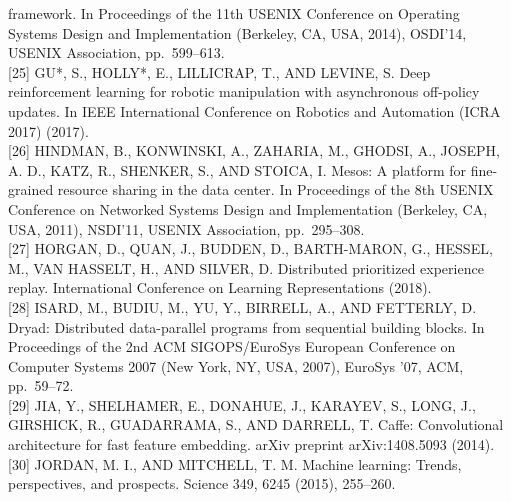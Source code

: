 \documentclass[
]{article}
\begin{document}
framework. In Proceedings of the 11th USENIX Conference on Operating
Systems Design and Implementation (Berkeley, CA, USA, 2014), OSDI'14,
USENIX Association, pp.~599--613.\\
{[}25{]} GU*, S., HOLLY*, E., LILLICRAP, T., AND LEVINE, S. Deep
reinforcement learning for robotic manipulation with asynchronous
off-policy updates. In IEEE International Conference on Robotics and
Automation (ICRA 2017) (2017).\\
{[}26{]} HINDMAN, B., KONWINSKI, A., ZAHARIA, M., GHODSI, A., JOSEPH, A.
D., KATZ, R., SHENKER, S., AND STOICA, I. Mesos: A platform for
fine-grained resource sharing in the data center. In Proceedings of the
8th USENIX Conference on Networked Systems Design and Implementation
(Berkeley, CA, USA, 2011), NSDI'11, USENIX Association, pp.~295--308.\\
{[}27{]} HORGAN, D., QUAN, J., BUDDEN, D., BARTH-MARON, G., HESSEL, M.,
VAN HASSELT, H., AND SILVER, D. Distributed prioritized experience
replay. International Conference on Learning Representations (2018).\\
{[}28{]} ISARD, M., BUDIU, M., YU, Y., BIRRELL, A., AND FETTERLY, D.
Dryad: Distributed data-parallel programs from sequential building
blocks. In Proceedings of the 2nd ACM SIGOPS/EuroSys European Conference
on Computer Systems 2007 (New York, NY, USA, 2007), EuroSys '07, ACM,
pp.~59--72.\\
{[}29{]} JIA, Y., SHELHAMER, E., DONAHUE, J., KARAYEV, S., LONG, J.,
GIRSHICK, R., GUADARRAMA, S., AND DARRELL, T. Caffe: Convolutional
architecture for fast feature embedding. arXiv preprint arXiv:1408.5093
(2014).\\
{[}30{]} JORDAN, M. I., AND MITCHELL, T. M. Machine learning: Trends,
perspectives, and prospects. Science 349, 6245 (2015), 255--260.
\end{document}
